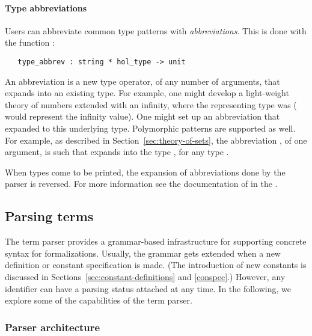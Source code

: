 \paragraph{Type abbreviations}

Users can abbreviate common type patterns with \emph{abbreviations}.
This is done with the \ML{} function :
\begin{hol}
\begin{verbatim}
   type_abbrev : string * hol_type -> unit
\end{verbatim}
\end{hol}
An abbreviation is a new type operator, of any number of arguments,
that expands into an existing type.  For example, one might develop a
light-weight theory of numbers extended with an infinity, where the
representing type was  ( would
represent the infinity value).  One might set up an abbreviation
 that expanded to this underlying type.
Polymorphic patterns are supported as well.  For example, as described
in Section~\ref{sec:theory-of-sets}, the abbreviation , of
one argument, is such that  expands into the type
, for any type .

When types come to be printed, the expansion of abbreviations done by
the parser is reversed.  For more information see the documentation of
 in the \REFERENCE.

\subsection{Parsing terms}

The term parser provides a grammar-based infrastructure for supporting
concrete syntax for formalizations. Usually, the \HOL{} grammar gets
extended when a new definition or constant specification is made. (The
introduction of new constants is discussed in
Sections~\ref{sec:constant-definitions} and \ref{conspec}.) However,
any identifier can have a parsing status attached at any time.
In the following, we explore some of the capabilities of the
\HOL{} term parser.


\subsubsection{Parser architecture}
\label{sec:parser:architecture}

